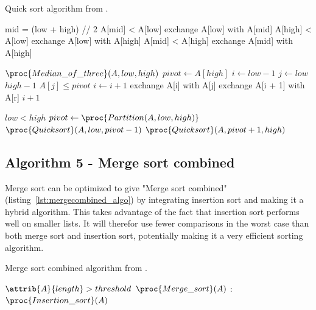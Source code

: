 \documentclass[sigconf, nonacm, natbib, screen, balance=False]{acmart}
\begin{document}
\begin{listing}
  \caption{Quick sort algorithm from \citet[Ch.~2.1]{CLRS_2009}.}
  \label{lst:quick_algo}
  
 \begin{codebox}
    \li mid = (low + high) // 2
    \li \If A[mid] < A[low]
    \li \Do
    exchange A[low] with A[mid]
    \End
    \li \If A[high] < A[low]
    \li \Do
    exchange A[low] with A[high]
    \End
    \li \If A[mid] < A[high]
    \li \Do
    exchange A[mid] with A[high]
  \end{codebox}

  \begin{codebox}
    \li $\proc{Median\_of\_three}(A, low, high)$
    \li $pivot \gets A[high]$
    \li $i \gets low - 1$
    \li \For $j \gets low $ \To $high -1$ 
    \li \Do
    \If $A[j] \leq pivot$
    \li \Do
    $i \gets i + 1$
    \li exchange A[i] with A[j]
    \End
    \End
    \li exchange A[i + 1] with A[r]
    \li \Return $i +1$
  \end{codebox}

  \begin{codebox}
    \li \If $low < high$
    \li \Do
    $pivot \gets \proc{Partition(A, low, high)}$
    \li $\proc{Quicksort}(A, low, pivot-1)$
    \li $\proc{Quicksort}(A, pivot+1, high)$
  \end{codebox}

\end{listing}

\subsection{Algorithm 5 - Merge sort combined}\label{sec:algo5}

Merge sort can be optimized to give "Merge sort combined" (listing~\ref{lst:mergecombined_algo}) by integrating insertion sort and making it a hybrid algorithm. This takes advantage of the fact that insertion sort performs well on smaller lists. It will therefor use fewer comparisons in the worst case than both merge sort and insertion sort, potentially making it a very efficient sorting algorithm.  

\begin{listing}
  \caption{Merge sort combined algorithm from \citet[Ch.~2.1]{CLRS_2009}.}
  \label{lst:mergecombined_algo}
  
 \begin{codebox}
    \li \If $\attrib{A}{length} > threshold$
    \li \Do
    $\proc{Merge\_sort}(A)$
    \li \Else:
    \li $\proc{Insertion\_sort}(A)$
  \end{codebox}
\end{listing}
\end{document}
